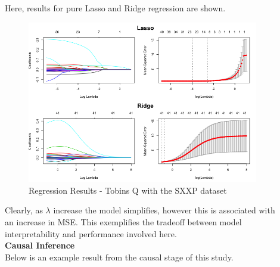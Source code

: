 \documentclass[final]{beamer}
\newlength{\sepwid}
\newlength{\onecolwid}
\begin{document}
\begin{frame}[t]
\begin{columns}[t]
\begin{column}{\onecolwid}
         \end{column}
\begin{column}{\sepwid}  \end{column}
\begin{column}{\onecolwid} %
         \vspace{-1cm}
         \begin{block}{}
         {\large \color{black} Here, results for pure Lasso and Ridge regression are shown.} 
         \begin{figure}[h!]
         \includegraphics[scale = 1.3]{images/Regression.png}
         \caption{\color {black} Regression Results - Tobins Q with the SXXP dataset}
         \end{figure}
         {\large \color{black} Clearly, as $\lambda$ increase the model simplifies, however this is associated with an increase in MSE. This exemplifies the tradeoff between model interpretability and performance involved here.    } \\
         {{\bf \large  \color{black} Causal Inference}} \\
         {\large \color{black} Below is an example result from the causal stage of this study. }\\~\\

\end{block}
\end{column}
\end{columns}
\end{frame}
\end{document}
